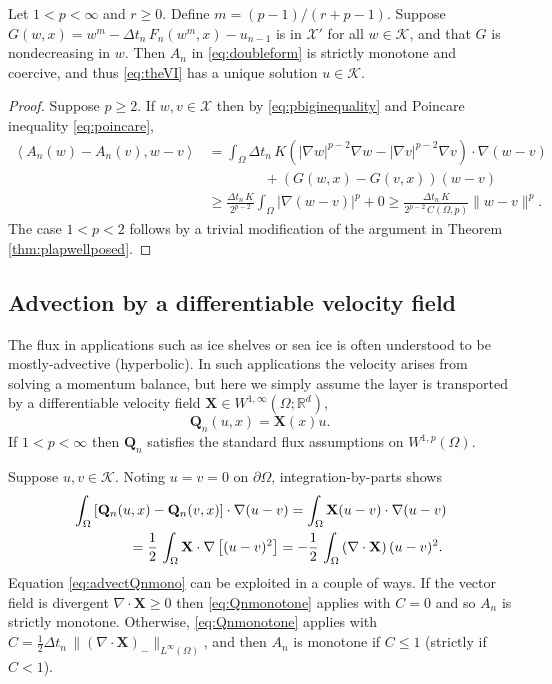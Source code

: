 \documentclass[final,onefignum]{siamart190516}
\newcommand\bQ{\mathbf{Q}}
\newcommand\bX{\mathbf{X}}
\newcommand{\Div}{\nabla\cdot}
\newcommand{\grad}{\nabla}
\newcommand{\ip}[2]{\ensuremath{\left<#1,#2\right>}}
\newcommand\RR{\mathbb{R}}
\begin{document}
\begin{theorem}
Let $1<p<\infty$ and $r\ge 0$.  Define $m = (p-1)/(r+p-1)$.  Suppose $G(w,x)=w^m - \Delta t_n\, F_n(w^m,x) - u_{n-1}$ is in $\mathcal{X}'$ for all $w\in\mathcal{K}$, and that $G$ is nondecreasing in $w$.  Then $A_n$ in \eqref{eq:doubleform} is strictly monotone and coercive, and thus \eqref{eq:theVI} has a unique solution $u\in\mathcal{K}$.
\end{theorem}

\begin{proof}
Suppose $p\ge 2$.  If $w,v\in\mathcal{X}$ then by \eqref{eq:pbiginequality} and Poincare inequality \eqref{eq:poincare},
\begin{align*}
\ip{A_n(w)-A_n(v)}{w-v} &= \int_\Omega \Delta t_n\, K \left(|\grad w|^{p-2} \grad w - |\grad v|^{p-2} \grad v\right) \cdot \grad (w-v) \\
  &\qquad\qquad + \left(G(w,x) - G(v,x)\right) (w-v) \\
  &\ge \frac{\Delta t_n\,K}{2^{p-2}} \int_\Omega |\grad (w-v)|^p + 0 \ge \frac{\Delta t_n\,K}{2^{p-2}\, C(\Omega,p)} \|w-v\|^p.
\end{align*}
The case $1<p<2$ follows by a trivial modification of the argument in Theorem \ref{thm:plapwellposed}.
\end{proof}

\subsection{Advection by a differentiable velocity field} \label{subsec:advect}  The flux in applications such as ice shelves or sea ice is often understood to be mostly-advective (hyperbolic).  In such applications the velocity arises from solving a momentum balance, but here we simply assume the layer is transported by a differentiable velocity field $\bX \in W^{1,\infty}(\Omega;\RR^d)$,
\begin{equation}
  \bQ_n(u,x) = \bX(x) u. \label{eq:advectflux}
\end{equation}
If $1<p<\infty$ then $\bQ_n$ satisfies the standard flux assumptions on $W^{1,p}(\Omega)$.

Suppose $u,v\in\mathcal{K}$.  Noting $u=v=0$ on $\partial \Omega$, integration-by-parts shows
\begin{align}
   &\int_\Omega \left[\bQ_n(u,x) - \bQ_n(v,x)\right] \cdot \grad (u - v) = \int_\Omega \bX (u-v) \cdot \grad (u - v)   \label{eq:advectQnmono} \\
   &\qquad\qquad = \frac{1}{2}\,\int_\Omega \bX \cdot \grad\left[ (u - v)^2 \right] = - \frac{1}{2}\,\int_\Omega \left(\Div\bX\right) (u - v)^2. \notag
\end{align}
Equation \eqref{eq:advectQnmono} can be exploited in a couple of ways.  If the vector field is divergent $\Div\bX\ge 0$ then \eqref{eq:Qnmonotone} applies with $C=0$ and so $A_n$ is strictly monotone.  Otherwise, \eqref{eq:Qnmonotone} applies with $C = \frac{1}{2}\Delta t_n\,\|(\Div\bX)_{-}\|_{L^\infty(\Omega)}$, and then $A_n$ is monotone if $C \le 1$ (strictly if $C < 1$).
\end{document}
